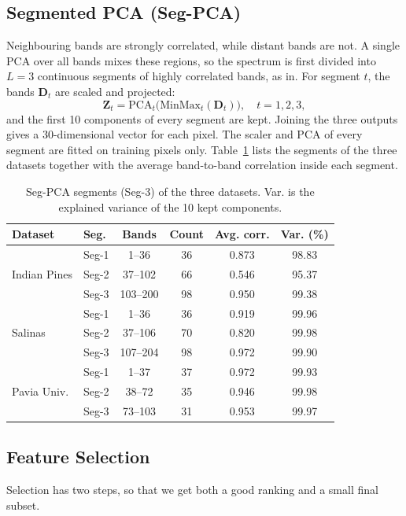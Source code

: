 \documentclass[conference]{IEEEtran}
\begin{document}
	\subsection{Segmented PCA (Seg-PCA)}
	Neighbouring bands are strongly correlated, while distant bands are not. A single PCA over all bands mixes these regions, so the spectrum is first divided into $L=3$ continuous segments of highly correlated bands, as in\cite{ahmed2024}. For segment $t$, the bands $\mathbf{D}_t$ are scaled and projected:
	\begin{equation}
		\mathbf{Z}_t = \mathrm{PCA}_t\big(\mathrm{MinMax}_t(\mathbf{D}_t)\big),\quad t=1,2,3,
	\end{equation}
	and the first 10 components of every segment are kept. Joining the three outputs gives a 30-dimensional vector for each pixel. The scaler and PCA of every segment are fitted on training pixels only. Table~\ref{segtable} lists the segments of the three datasets together with the average band-to-band correlation inside each segment.
	
	\begin{table}[t]
		\centering
		\caption{Seg-PCA segments (Seg-3) of the three datasets. Var. is the explained variance of the 10 kept components.}
		\label{segtable}
		\footnotesize
		\setlength{\tabcolsep}{1.8pt}
		\begin{tabular}{@{}llcccc@{}}
			\toprule
			Dataset & Seg. & Bands & Count & Avg. corr. & Var. (\%) \\ \midrule
			\multirow{3}{*}{Indian Pines} & Seg-1 & 1--36    & 36 & 0.873 & 98.83 \\
			& Seg-2 & 37--102  & 66 & 0.546 & 95.37 \\
			& Seg-3 & 103--200 & 98 & 0.950 & 99.38 \\ \midrule
			\multirow{3}{*}{Salinas}      & Seg-1 & 1--36    & 36 & 0.919 & 99.96 \\
			& Seg-2 & 37--106  & 70 & 0.820 & 99.98 \\
			& Seg-3 & 107--204 & 98 & 0.972 & 99.90 \\ \midrule
			\multirow{3}{*}{Pavia Univ.} & Seg-1 & 1--37    & 37 & 0.972 & 99.93 \\
			& Seg-2 & 38--72   & 35 & 0.946 & 99.98 \\
			& Seg-3 & 73--103  & 31 & 0.953 & 99.97 \\ \bottomrule
		\end{tabular}
	\end{table}
	
	\subsection{Feature Selection}
	Selection has two steps, so that we get both a good ranking and a small final subset.
	
\end{document}
